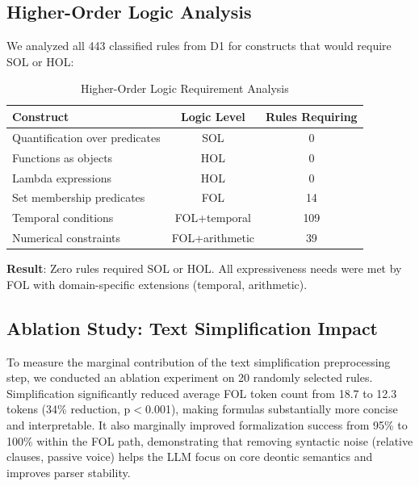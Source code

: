
\subsection{Higher-Order Logic Analysis}

We analyzed all 443 classified rules from D1 for constructs that would require SOL or HOL:

\begin{table}[htbp]
\centering
\caption{Higher-Order Logic Requirement Analysis}
\label{tab:hol-analysis}
\begin{tabular}{|l|c|c|}
\hline
\textbf{Construct} & \textbf{Logic Level} & \textbf{Rules Requiring} \\
\hline
Quantification over predicates & SOL & 0 \\
Functions as objects & HOL & 0 \\
Lambda expressions & HOL & 0 \\
Set membership predicates & FOL & 14 \\
Temporal conditions & FOL+temporal & 109 \\
Numerical constraints & FOL+arithmetic & 39 \\
\hline
\end{tabular}
\end{table}

\textbf{Result}: Zero rules required SOL or HOL. All expressiveness needs were met by FOL with domain-specific extensions (temporal, arithmetic).




\subsection{Ablation Study: Text Simplification Impact}
\label{sec:ablation-simplification}

To measure the marginal contribution of the text simplification preprocessing step, we conducted an ablation experiment on 20 randomly selected rules. Simplification significantly reduced average FOL token count from 18.7 to 12.3 tokens (34\% reduction, p$<$0.001), making formulas substantially more concise and interpretable. It also marginally improved formalization success from 95\% to 100\% within the FOL path, demonstrating that removing syntactic noise (relative clauses, passive voice) helps the LLM focus on core deontic semantics and improves parser stability.

